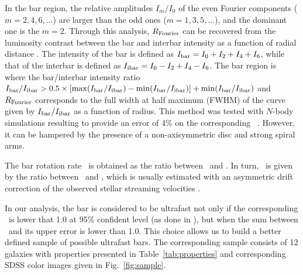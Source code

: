 \documentclass{aa}
\begin{document}
\noindent In the bar region, the relative amplitudes $I_m/I_0$ of the even Fourier components ($m=2,4,6,...$) are larger than the odd ones ($m=1,3,5,...$), and the dominant one is the $m=2$. Through this analysis, $R_{\rm Fourier}$ can be recovered from the luminosity contrast between the bar and interbar intensity as a function of radial distance \citep{Aguerri2000}. The intensity of the bar is defined as $I_{\rm bar}=I_0+I_2+I_4+I_6$, while that of the interbar is defined as $I_{\rm ibar}=I_0-I_2+I_4-I_6$. The bar region is where the bar/interbar intensity ratio $I_{\rm bar}/I_{\rm ibar} > 0.5 \times [\max (I_{\rm bar}/I_{\rm ibar})-\min (I_{\rm bar}/I_{\rm ibar})]+\min (I_{\rm bar}/I_{\rm ibar})$ and $R_{\rm Fourier}$ corresponds to the full width at half maximum (FWHM) of the curve given by $I_{\rm bar}/I_{\rm ibar}$ as a function of radius. This method was tested with $N$-body simulations resulting to provide an error of 4\% on the corresponding \rbar\ \citep{Athanassoula2002}. However, it can be hampered by the presence of a non-axisymmetric disc and strong spiral arms. 

The bar rotation rate \rr\ is obtained as the ratio between \rcor\ and \rbar. In turn, \rcor\ is given by the ratio between \omegabar\ and \vcirc, which is usually estimated with an asymmetric drift correction of the observed stellar streaming velocities \citep{Merrifield1995,Debattista2002,Aguerri2015,Cuomo2019b}.

In our analysis, the bar is considered to be ultrafast not only if the corresponding \rr\ is lower that 1.0 at 95\% confident level (as done in \citealt{Cuomo2020}), but when the sum between \rr\ and its upper error is lower than 1.0. This choice allows us to build a better defined sample of possible ultrafast bars. The corresponding sample consists of 12 galaxies with properties presented in Table~\ref{tab:properties} and corresponding SDSS color images given in Fig.~\ref{fig:sample}.
\end{document}
